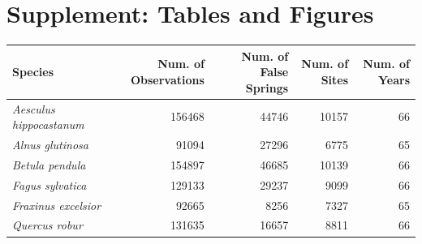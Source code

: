 \documentclass{article}\usepackage[]{graphicx}\usepackage[]{color}
\begin{document}
{\newpage
\nocite{NPN2019}


\newpage
\section*{Supplement: Tables and Figures}
  
\begin{center}
 \label{tab:spp} 
\begin{tabular}{l r r r r}
\hline
Species & Num. of Observations & Num. of False Springs & Num. of Sites & Num. of Years \\
\hline
\textit{Aesculus hippocastanum} & 156468 & 44746 & 10157 & 66  \\
\textit{Alnus glutinosa} & 91094 & 27296 & 6775 & 65 \\
\textit{Betula pendula} & 154897 & 46685 & 10139 & 66 \\
\textit{Fagus sylvatica} & 129133 & 29237 & 9099 & 66 \\
\textit{Fraxinus excelsior} & 92665 & 8256 & 7327 & 65 \\
\textit{Quercus robur} & 131635 & 16657 & 8811 & 66 \\
\hline
\end{tabular}
\end{center}

\vspace{15ex}




}
\end{document}
